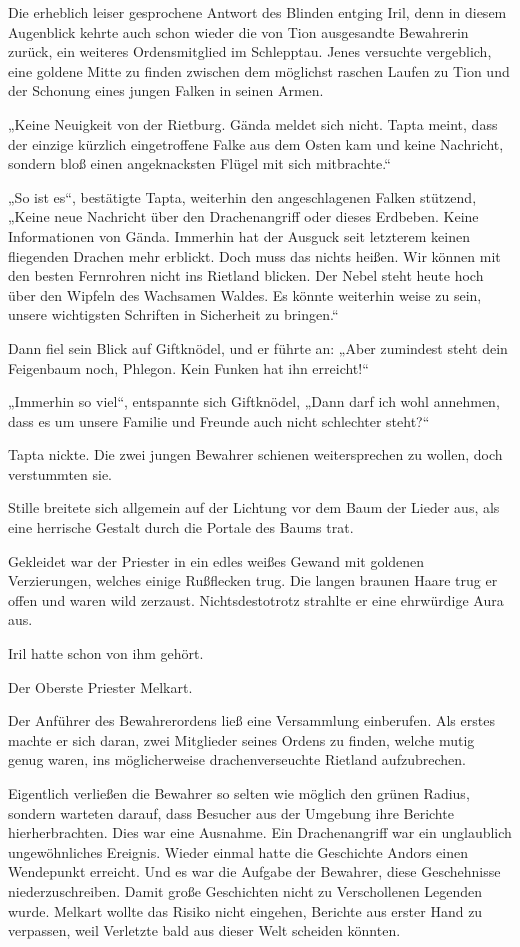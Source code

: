 Die erheblich leiser gesprochene Antwort des Blinden entging Iril, denn in diesem Augenblick kehrte auch schon wieder die von Tion ausgesandte Bewahrerin zurück, ein weiteres Ordensmitglied im Schlepptau. Jenes versuchte vergeblich, eine goldene Mitte zu finden zwischen dem möglichst raschen Laufen zu Tion und der Schonung eines jungen Falken in seinen Armen.

„Keine Neuigkeit von der Rietburg. Gända meldet sich nicht. Tapta meint, dass der einzige kürzlich eingetroffene Falke aus dem Osten kam und keine Nachricht, sondern bloß einen angeknacksten Flügel mit sich mitbrachte.“

„So ist es“, bestätigte Tapta, weiterhin den angeschlagenen Falken stützend, „Keine neue Nachricht über den Drachenangriff oder dieses Erdbeben. Keine Informationen von Gända. Immerhin hat der Ausguck seit letzterem keinen fliegenden Drachen mehr erblickt. Doch muss das nichts heißen. Wir können mit den besten Fernrohren nicht ins Rietland blicken. Der Nebel steht heute hoch über den Wipfeln des Wachsamen Waldes. Es könnte weiterhin weise zu sein, unsere wichtigsten Schriften in Sicherheit zu bringen.“

Dann fiel sein Blick auf Giftknödel, und er führte an: „Aber zumindest steht dein Feigenbaum noch, Phlegon. Kein Funken hat ihn erreicht!“

„Immerhin so viel“, entspannte sich Giftknödel, „Dann darf ich wohl annehmen, dass es um unsere Familie und Freunde auch nicht schlechter steht?“

Tapta nickte. Die zwei jungen Bewahrer schienen weitersprechen zu wollen, doch verstummten sie.

Stille breitete sich allgemein auf der Lichtung vor dem Baum der Lieder aus, als eine herrische Gestalt durch die Portale des Baums trat.

Gekleidet war der Priester in ein edles weißes Gewand mit goldenen Verzierungen, welches einige Rußflecken trug. Die langen braunen Haare trug er offen und waren wild zerzaust. Nichtsdestotrotz strahlte er eine ehrwürdige Aura aus.

Iril hatte schon von ihm gehört.

Der Oberste Priester Melkart.

Der Anführer des Bewahrerordens ließ eine Versammlung einberufen. Als erstes machte er sich daran, zwei Mitglieder seines Ordens zu finden, welche mutig genug waren, ins möglicherweise drachenverseuchte Rietland aufzubrechen.

Eigentlich verließen die Bewahrer so selten wie möglich den grünen Radius, sondern warteten darauf, dass Besucher aus der Umgebung ihre Berichte hierherbrachten. Dies war eine Ausnahme. Ein Drachenangriff war ein unglaublich ungewöhnliches Ereignis. Wieder einmal hatte die Geschichte Andors einen Wendepunkt erreicht. Und es war die Aufgabe der Bewahrer, diese Geschehnisse niederzuschreiben. Damit große Geschichten nicht zu Verschollenen Legenden wurde. Melkart wollte das Risiko nicht eingehen, Berichte aus erster Hand zu verpassen, weil Verletzte bald aus dieser Welt scheiden könnten.

